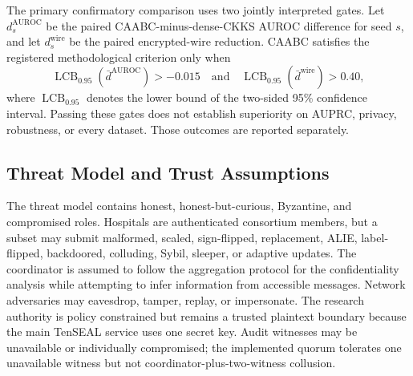 The primary confirmatory comparison uses two jointly interpreted gates. Let $d_s^{\mathrm{AUROC}}$ be the paired CAABC-minus-dense-CKKS AUROC difference for seed $s$, and let $d_s^{\mathrm{wire}}$ be the paired encrypted-wire reduction. CAABC satisfies the registered methodological criterion only when
\begin{equation}
    \operatorname{LCB}_{0.95}\!\left(\bar d^{\mathrm{AUROC}}\right)>-0.015
    \quad\text{and}\quad
    \operatorname{LCB}_{0.95}\!\left(\bar d^{\mathrm{wire}}\right)>0.40,
    \label{eq:primary-gates}
\end{equation}
where $\operatorname{LCB}_{0.95}$ denotes the lower bound of the two-sided 95\% confidence interval. Passing these gates does not establish superiority on AUPRC, privacy, robustness, or every dataset. Those outcomes are reported separately.

\subsection{Threat Model and Trust Assumptions}
\label{subsec:threat-model}

The threat model contains honest, honest-but-curious, Byzantine, and compromised roles. Hospitals are authenticated consortium members, but a subset may submit malformed, scaled, sign-flipped, replacement, ALIE, label-flipped, backdoored, colluding, Sybil, sleeper, or adaptive updates. The coordinator is assumed to follow the aggregation protocol for the confidentiality analysis while attempting to infer information from accessible messages. Network adversaries may eavesdrop, tamper, replay, or impersonate. The research authority is policy constrained but remains a trusted plaintext boundary because the main TenSEAL service uses one secret key. Audit witnesses may be unavailable or individually compromised; the implemented quorum tolerates one unavailable witness but not coordinator-plus-two-witness collusion.

